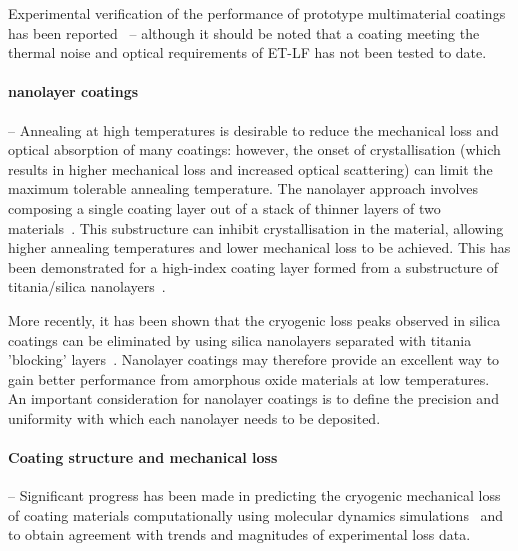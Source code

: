 Experimental verification of the performance of prototype multimaterial coatings has been reported~\cite{Gras_GWADW,Kinley_Hanlon_Warsaw} -- although it should be noted that a coating meeting the thermal noise and optical requirements of ET-LF has not been tested to date.

\paragraph{nanolayer coatings} -- Annealing at high temperatures is desirable to reduce the mechanical loss and optical absorption of many coatings: however, the onset of crystallisation (which results in higher mechanical loss and increased optical scattering) can limit the maximum tolerable annealing temperature. The nanolayer approach involves composing a single coating layer out of a stack of thinner layers of two materials~\cite{Pan2014,Sankur1989}. This substructure can inhibit crystallisation in the material, allowing higher annealing temperatures and lower mechanical loss to be achieved. This has been demonstrated for a high-index coating layer formed from a substructure of titania/silica nanolayers~\cite{Pan2014}.

More recently, it has been shown that the cryogenic loss peaks observed in silica coatings can be eliminated by using silica nanolayers separated with titania 'blocking' layers~\cite{Kuo2019}. Nanolayer coatings may therefore provide an excellent way to gain better performance from amorphous oxide materials at low temperatures. An important consideration for nanolayer coatings is to define the precision and uniformity with which each nanolayer needs to be deposited.

\paragraph{Coating structure and mechanical loss} -- Significant progress has been made in predicting the cryogenic mechanical loss of coating materials computationally using molecular dynamics simulations~\cite{Hamadan2014,Trinastic2016,Billman2017} and to obtain agreement with trends and magnitudes of experimental loss data.

